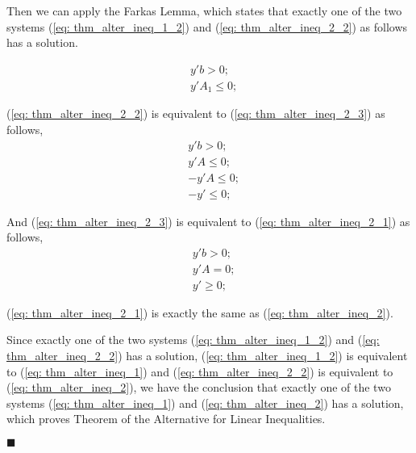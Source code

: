 Then we can apply the Farkas Lemma, which states that exactly one of the two systems (\ref{eq: thm_alter_ineq_1_2}) and (\ref{eq: thm_alter_ineq_2_2}) as follows has a solution.

\begin{equation}
\label{eq: thm_alter_ineq_2_2}
 \begin{array}{lrcll}
    & y'b >0;\\
    & y'A_1 \leq0;
  \end{array}
\end{equation}

(\ref{eq: thm_alter_ineq_2_2}) is equivalent to (\ref{eq: thm_alter_ineq_2_3}) as follows,
\begin{equation}
\label{eq: thm_alter_ineq_2_3}
 \begin{array}{lrcll}
    & y'b >0;\\
    & y'A \leq0;\\
    & -y'A \leq0;\\
    & -y' \leq0;
  \end{array}
\end{equation}

And (\ref{eq: thm_alter_ineq_2_3}) is equivalent to (\ref{eq: thm_alter_ineq_2_1}) as follows,
\begin{equation}
\label{eq: thm_alter_ineq_2_1}
 \begin{array}{lrcll}
    & y'b >0;\\
    & y'A =0;\\
    & y' \geq 0;
  \end{array}
\end{equation}

(\ref{eq: thm_alter_ineq_2_1}) is exactly the same as (\ref{eq: thm_alter_ineq_2}). 

Since exactly one of the two systems (\ref{eq: thm_alter_ineq_1_2}) and (\ref{eq: thm_alter_ineq_2_2}) has a solution, (\ref{eq: thm_alter_ineq_1_2}) is equivalent to (\ref{eq: thm_alter_ineq_1}) and (\ref{eq: thm_alter_ineq_2_2}) is equivalent to (\ref{eq: thm_alter_ineq_2}), we have the conclusion that exactly one of the two systems (\ref{eq: thm_alter_ineq_1}) and (\ref{eq: thm_alter_ineq_2}) has a solution, which proves Theorem of the Alternative for Linear Inequalities.
\begin{flushright} $\blacksquare$ \end{flushright}